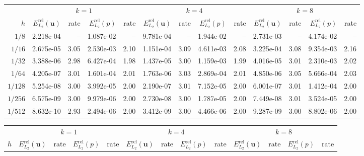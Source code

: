 \begin{landscape}
\thispagestyle{empty}
\begin{center}
\centering
{}
\label{tab:annulus_thieulot_v2_p1_cont}
\small
\begin{tabular}{
r rr rr rr rr rr rr
}
\toprule
& \multicolumn{4}{c}{$k=1$} & \multicolumn{4}{c}{$k=4$} & \multicolumn{4}{c}{$k=8$} \\
\cmidrule(lr){2-5}\cmidrule(lr){6-9}\cmidrule(lr){10-13}
$h$ & $E_{L_2}^{\mathrm{rel}}(\mathbf{u})$ & rate & $E_{L_2}^{\mathrm{rel}}(p)$ & rate & $E_{L_2}^{\mathrm{rel}}(\mathbf{u})$ & rate & $E_{L_2}^{\mathrm{rel}}(p)$ & rate & $E_{L_2}^{\mathrm{rel}}(\mathbf{u})$ & rate & $E_{L_2}^{\mathrm{rel}}(p)$ & rate \\
\midrule
$1/8$ & 2.218e-04 & -- & 1.087e-02 & -- & 9.781e-04 & -- & 1.944e-02 & -- & 2.731e-03 & -- & 4.174e-02 & -- \\
$1/16$ & 2.675e-05 & 3.05 & 2.530e-03 & 2.10 & 1.151e-04 & 3.09 & 4.611e-03 & 2.08 & 3.225e-04 & 3.08 & 9.354e-03 & 2.16 \\
$1/32$ & 3.388e-06 & 2.98 & 6.427e-04 & 1.98 & 1.437e-05 & 3.00 & 1.159e-03 & 1.99 & 4.016e-05 & 3.01 & 2.310e-03 & 2.02 \\
$1/64$ & 4.205e-07 & 3.01 & 1.601e-04 & 2.01 & 1.763e-06 & 3.03 & 2.869e-04 & 2.01 & 4.850e-06 & 3.05 & 5.666e-04 & 2.03 \\
$1/128$ & 5.254e-08 & 3.00 & 3.992e-05 & 2.00 & 2.190e-07 & 3.01 & 7.152e-05 & 2.00 & 6.001e-07 & 3.01 & 1.412e-04 & 2.00 \\
$1/256$ & 6.575e-09 & 3.00 & 9.979e-06 & 2.00 & 2.730e-08 & 3.00 & 1.787e-05 & 2.00 & 7.449e-08 & 3.01 & 3.524e-05 & 2.00 \\
$1/512$ & 8.632e-10 & 2.93 & 2.494e-06 & 2.00 & 3.412e-09 & 3.00 & 4.466e-06 & 2.00 & 9.287e-09 & 3.00 & 8.802e-06 & 2.00 \\
\bottomrule
\end{tabular}
\end{center}
\begin{center}
\centering
{}
\label{tab:annulus_thieulot_v3_p2_cont}
\small
\begin{tabular}{
r rr rr rr rr rr rr
}
\toprule
& \multicolumn{4}{c}{$k=1$} & \multicolumn{4}{c}{$k=4$} & \multicolumn{4}{c}{$k=8$} \\
\cmidrule(lr){2-5}\cmidrule(lr){6-9}\cmidrule(lr){10-13}
$h$ & $E_{L_2}^{\mathrm{rel}}(\mathbf{u})$ & rate & $E_{L_2}^{\mathrm{rel}}(p)$ & rate & $E_{L_2}^{\mathrm{rel}}(\mathbf{u})$ & rate & $E_{L_2}^{\mathrm{rel}}(p)$ & rate & $E_{L_2}^{\mathrm{rel}}(\mathbf{u})$ & rate & $E_{L_2}^{\mathrm{rel}}(p)$ & rate \\

\end{tabular}
\end{center}
\end{landscape}
